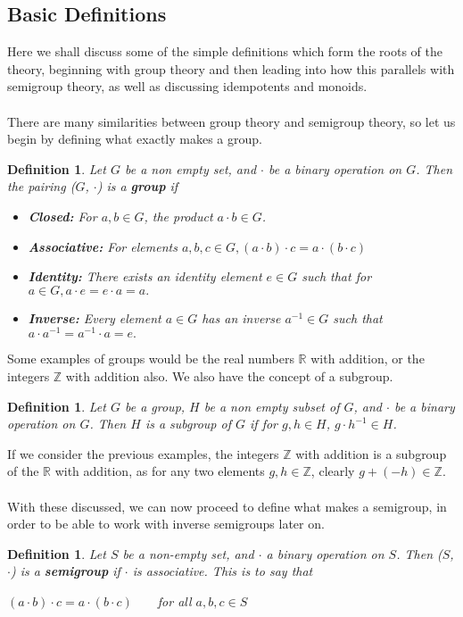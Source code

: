 \documentclass[12pt]{article}
\newtheorem{defn}[theorem]{Definition}
\begin{document}
\subsection{Basic Definitions}
Here we shall discuss some of the simple definitions which form the roots of the theory, beginning with group theory and then leading into how this parallels with semigroup theory, as well as discussing idempotents and monoids.\\
\\There are many similarities between group theory and semigroup theory, so let us begin by defining what exactly makes a group.
\begin{defn}\label{defn2.1}
	Let $G$ be a non empty set, and $\cdot$ be a binary operation on $G$. Then the pairing ($G$, $\cdot$) is a \textbf{group} if
	\begin{itemize}[leftmargin=*]
		\item[] \textbf{Closed:}  For $a,b \in G$, the product $a \cdot b \in G$.
		\item[] \textbf{Associative:} For elements $a, b, c \in G, (a \cdot b) \cdot c = a \cdot (b \cdot c)$
		\item[] \textbf{Identity:}  There exists an identity element $e \in G$ such that for $a \in G, a \cdot e = e \cdot a = a.$
		\item[] \textbf{Inverse:}  Every element $a \in G$ has an inverse $a^{-1} \in G$ such that $a \cdot a^{-1} = a^{-1} \cdot a = e.$
	\end{itemize}
\end{defn}
\noindent Some examples of groups would be the real numbers $\mathbb{R}$ with addition, or the integers $\mathbb{Z}$ with addition also. We also have the concept of a subgroup.
\begin{defn}
	Let $G$ be a group, $H$ be a non empty subset of $G$, and $\cdot$ be a binary operation on $G$. Then $H$ is a subgroup of $G$ if for $g,h \in H$, $g\cdot h^{-1} \in H$.
\end{defn}
\noindent If we consider the previous examples, the integers $\mathbb{Z}$ with addition is a subgroup of the $\mathbb{R}$ with addition, as for any two elements $g,h \in \mathbb{Z}$, clearly $g+(-h) \in \mathbb{Z}$.\\
\\With these discussed, we can now proceed to define what makes a semigroup, in order to be able to work with inverse semigroups later on.
\begin{defn}\label{defnsemi}
	Let $S$ be a non-empty set, and $\cdot$ a binary operation on $S$. Then ($S$, $\cdot$) is a \textbf{semigroup} if $\cdot$ is associative. This is to say that
	\begin{center}
		$(a \cdot b) \cdot c = a \cdot (b \cdot c) \qquad $for all $a,b,c \in S$
	\end{center}
\end{defn}
\end{document}
